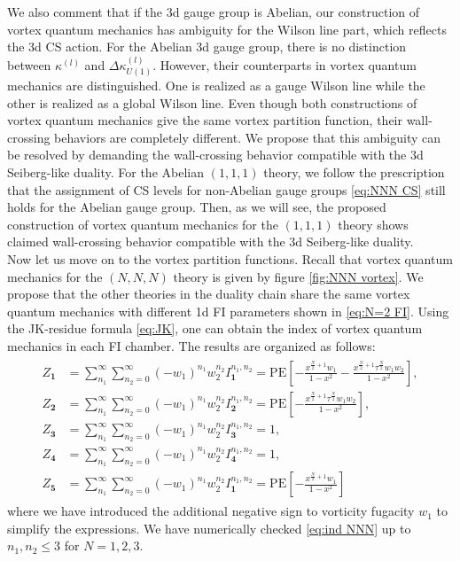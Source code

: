 \documentclass[a4paper,11pt]{article}
\begin{document}
We also comment that if the 3d gauge group is Abelian, our construction of vortex quantum mechanics has ambiguity for the Wilson line part, which reflects the 3d CS action. For the Abelian 3d gauge group, there is no distinction between $\kappa^{(l)}$ and $\Delta \kappa_{U(1)}^{(l)}$. However, their counterparts in vortex quantum mechanics are distinguished. One is realized as a gauge Wilson line while the other is realized as a global Wilson line. Even though both constructions of vortex quantum mechanics give the same vortex partition function, their wall-crossing behaviors are completely different. We propose that this ambiguity can be resolved by demanding the wall-crossing behavior compatible with the 3d Seiberg-like duality. For the Abelian $(1,1,1)$ theory, we follow the prescription that the assignment of CS levels for non-Abelian gauge groups \eqref{eq:NNN CS} still holds for the Abelian gauge group. Then, as we will see, the proposed construction of vortex quantum mechanics for the $(1,1,1)$ theory shows claimed wall-crossing behavior compatible with the 3d Seiberg-like duality.
\\


Now let us move on to the vortex partition functions. Recall that vortex quantum mechanics for the $(N,N,N)$ theory is given by figure \ref{fig:NNN vortex}. We propose that the other theories in the duality chain share the same vortex quantum mechanics with different 1d FI parameters shown in \eqref{eq:N=2 FI}. Using the JK-residue formula \eqref{eq:JK}, one can obtain the index of vortex quantum mechanics in each FI chamber. The results are organized as follows:
\begin{align}
\begin{aligned}
\label{eq:ind NNN}
Z_{\mathbf 1} &= \sum_{n_1}^\infty \sum_{n_2 = 0}^\infty (-w_1)^{n_1} w_2^{n_2} I^{n_1,n_2}_{\mathbf 1} = \mathrm{PE} \left[-\frac{x^{\frac{N}{2}+1} w_1}{1-x^2}-\frac{x^{\frac{N}{2}+1} \tau^{\frac{N}{2}} w_1 w_2}{1-x^2}\right], \\
Z_{\mathbf 2} &= \sum_{n_1}^\infty \sum_{n_2 = 0}^\infty (-w_1)^{n_1} w_2^{n_2} I^{n_1,n_2}_{\mathbf 2} = \mathrm{PE} \left[-\frac{x^{\frac{N}{2}
+1} \tau^{\frac{N}{2}} w_1 w_2}{1-x^2}\right], \\
Z_{\mathbf 3} &= \sum_{n_1}^\infty \sum_{n_2 = 0}^\infty (-w_1)^{n_1} w_2^{n_2} I^{n_1,n_2}_{\mathbf 3} = 1, \\
Z_{\mathbf 4} &= \sum_{n_1}^\infty \sum_{n_2 = 0}^\infty (-w_1)^{n_1} w_2^{n_2} I^{n_1,n_2}_{\mathbf 4} = 1, \\
Z_{\mathbf 5} &= \sum_{n_1}^\infty \sum_{n_2 = 0}^\infty (-w_1)^{n_1} w_2^{n_2} I^{n_1,n_2}_{\mathbf 1} = \mathrm{PE} \left[-\frac{x^{\frac{N}{2}+1} w_1}{1-x^2}\right]
\end{aligned}
\end{align}
where we have introduced the additional negative sign to vorticity fugacity $w_1$ to simplify the expressions. We have numerically checked \eqref{eq:ind NNN} up to $n_1,n_2 \leq 3$ for $N =1,2,3$.
\end{document}
